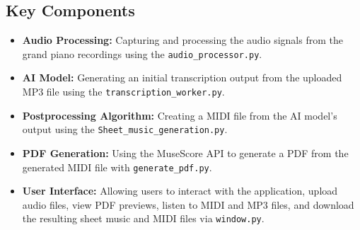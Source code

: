 \documentclass{article}
\begin{document}
\subsection{Key Components}
\begin{itemize}
    \item \textbf{Audio Processing:} Capturing and processing the audio signals from the grand piano recordings using the \texttt{audio\_processor.py}.
    \item \textbf{AI Model:} Generating an initial transcription output from the uploaded MP3 file using the \texttt{transcription\_worker.py}.
    \item \textbf{Postprocessing Algorithm:} Creating a MIDI file from the AI model's output using the \texttt{Sheet\_music\_generation.py}.
    \item \textbf{PDF Generation:} Using the MuseScore API to generate a PDF from the generated MIDI file with \texttt{generate\_pdf.py}.
    \item \textbf{User Interface:} Allowing users to interact with the application, upload audio files, view PDF previews, listen to MIDI and MP3 files, and download the resulting sheet music and MIDI files via \texttt{window.py}.
\end{itemize}

\FloatBarrier %
\end{document}
